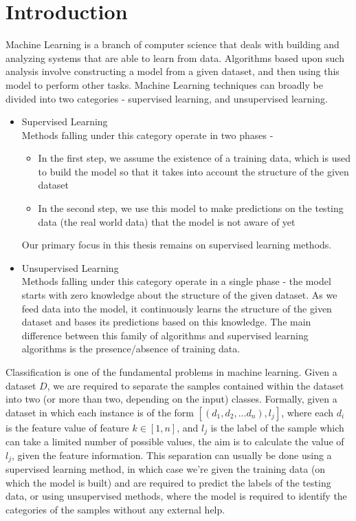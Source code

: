 \section{Introduction}
Machine Learning is a branch of computer science that deals with building and analyzing systems that are able to learn from data. Algorithms based upon such analysis involve constructing a model from a given dataset, and then using this model to perform other tasks. Machine Learning techniques can broadly be divided into two categories - supervised learning, and unsupervised learning.
\begin{itemize}
    \item{
    Supervised Learning\\
    Methods falling under this category operate in two phases -
    \begin{itemize}
        \item{In the first step, we assume the existence of a training data, which is used to build the model so that it takes into account the structure of the given dataset}
        \item{In the second step, we use this model to make predictions on the testing data (the real world data) that the model is not aware of yet}
    \end{itemize}
    Our primary focus in this thesis remains on supervised learning methods.
    }
    \item{
    Unsupervised Learning\\
    Methods falling under this category operate in a single phase - the model starts with zero knowledge about the structure of the given dataset. As we feed data into the model, it continuously learns the structure of the given dataset and bases its predictions based on this knowledge. The main difference between this family of algorithms and supervised learning algorithms is the presence/absence of training data.
    }
\end{itemize}
Classification is one of the fundamental problems in machine learning. Given a dataset $D$, we are required to separate the samples contained within the dataset into two (or more than two, depending on the input) classes. Formally, given a dataset in which each instance is of the form $[(d_1, d_2, ... d_n), l_j]$, where each $d_i$ is the feature value of feature $k \in [1, n]$, and $l_j$ is the label of the sample which can take a limited number of possible values, the aim is to calculate the value of $l_j$, given the feature information. This separation can usually be done using a supervised learning method, in which case we're given the training data (on which the model is built) and are required to predict the labels of the testing data, or using unsupervised methods, where the model is required to identify the categories of the samples without any external help.

